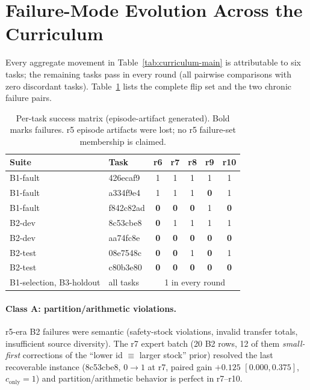 \section{Failure-Mode Evolution Across the Curriculum}
\label{sec:failure-evolution}

Every aggregate movement in Table~\ref{tab:curriculum-main} is attributable to six
tasks; the remaining tasks pass in every round (all pairwise comparisons with zero
discordant tasks). Table~\ref{tab:flips} lists the complete flip set and the two
chronic failure pairs.

\begin{table}[t]
\centering\small
\begin{tabular}{llccccc}
\toprule
Suite & Task & r6 & r7 & r8 & r9 & r10 \\
\midrule
B1-fault & 426ecaf9 & 1 & 1 & 1 & 1 & 1 \\
B1-fault & a334f9e4 & 1 & 1 & 1 & \textbf{0} & 1 \\
B1-fault & f842c82ad & \textbf{0} & \textbf{0} & \textbf{0} & 1 & \textbf{0} \\
B2-dev   & 8c53cbe8 & \textbf{0} & 1 & 1 & 1 & 1 \\
B2-dev   & aa74fc8e & \textbf{0} & \textbf{0} & \textbf{0} & \textbf{0} & \textbf{0} \\
B2-test  & 08e7548c & \textbf{0} & \textbf{0} & 1 & \textbf{0} & 1 \\
B2-test  & c80b3e80 & \textbf{0} & \textbf{0} & \textbf{0} & \textbf{0} & \textbf{0} \\
\midrule
B1-selection, B3-holdout & all tasks & \multicolumn{5}{c}{1 in every round} \\
\bottomrule
\end{tabular}
\caption{Per-task success matrix (episode-artifact generated). Bold marks failures.
r5 episode artifacts were lost; no r5 failure-set membership is claimed.}
\label{tab:flips}
\end{table}

\paragraph{Class A: partition/arithmetic violations.}
r5-era B2 failures were semantic (safety-stock violations, invalid transfer
totals, insufficient source diversity). The r7 expert batch (20 B2 rows, 12 of
them \emph{small-first} corrections of the ``lower id $\equiv$ larger stock''
prior) resolved the last recoverable instance (8c53cbe8, $0{\to}1$ at r7, paired
gain $+0.125$ $[0.000, 0.375]$, $c_{\text{only}}{=}1$) and partition/arithmetic
behavior is perfect in r7--r10.

